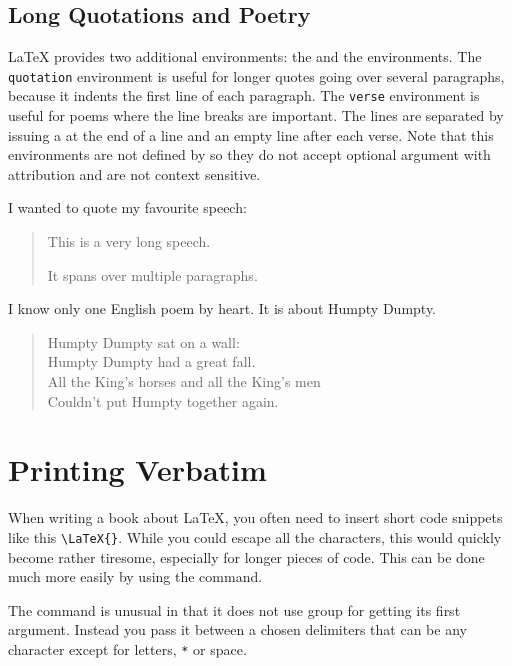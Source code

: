 \subsection{Long Quotations and Poetry}
\LaTeX{} provides two additional environments: the  and the
 environments. The \texttt{quotation} environment is useful for
longer quotes going over several paragraphs, because it indents the first line
of each paragraph. The \texttt{verse} environment is useful for poems where the
line breaks are important. The lines are separated by issuing a \ci{\bs} at the
end of a line and an empty line after each verse. Note that this environments
are not defined by  so they do not accept optional argument with
attribution and are not context sensitive.

\begin{example}
I wanted to quote my
favourite speech:
\begin{quotation}
  This is a very
  long speech.

  It spans over multiple
  paragraphs.
\end{quotation}
\end{example}

\begin{example}
I know only one English poem by
heart. It is about Humpty Dumpty.
\begin{verse}
Humpty Dumpty sat on a wall:\\
Humpty Dumpty had a great fall.\\
All the King's horses and all
the King's men\\
Couldn't put Humpty together
again.
\end{verse}
\end{example}

\section{Printing Verbatim}

When writing a book about \LaTeX{}, you often need to insert short code
snippets like this \verb|\LaTeX{}|. While you could escape all the characters,
this would quickly become rather tiresome, especially for longer pieces of
code. This can be done much more easily by using the  command.

The  command is unusual in that it does not use group for getting its
first argument. Instead you pass it between a chosen delimiters that can be
any character except for letters, \verb|*| or space.

